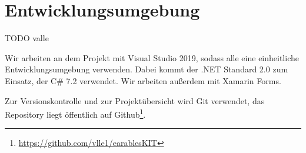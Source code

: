 \documentclass[a4paper,12pt]{article}
\begin{document}
\section{Entwicklungsumgebung}
TODO valle

Wir arbeiten an dem Projekt mit Visual Studio 2019, sodass alle eine einheitliche Entwicklungsumgebung verwenden.
Dabei kommt der .NET Standard 2.0 zum Einsatz, der C\# 7.2 verwendet. Wir arbeiten außerdem mit Xamarin Forms.

Zur Versionskontrolle und zur Projektübersicht wird Git verwendet, das Repository liegt öffentlich auf Github\footnote{\url{https://github.com/vlle1/earablesKIT}}.
\clearpage

\end{document}

